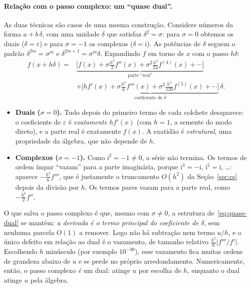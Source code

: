 \documentclass[11pt,a4paper]{article}
\begin{document}
\paragraph{Relação com o passo complexo: um ``quase dual''.} As duas técnicas são casos de uma mesma construção. Considere números da forma $a+b\,\delta$, com uma unidade $\delta$ que satisfaz $\delta^2=\sigma$: para $\sigma=0$ obtemos os duais ($\delta=\varepsilon$) e para $\sigma=-1$ os complexos ($\delta=\mathrm i$). As potências de $\delta$ seguem o padrão $\delta^{2m}=\sigma^m$ e $\delta^{2m+1}=\sigma^m\delta$. Expandindo $f$ em torno de $x$ com o passo $h\delta$:
\begin{equation}
\begin{aligned}
f(x+h\delta) ={}& \underbrace{\Big[f(x) + \sigma\frac{h^2}{2}f''(x) + \sigma^2\frac{h^4}{24}f^{(4)}(x)+\cdots\Big]}_{\text{parte ``real''}}\\
&+ \underbrace{\Big[h f'(x) + \sigma\frac{h^3}{6}f'''(x) + \sigma^2\frac{h^5}{120}f^{(5)}(x)+\cdots\Big]}_{\text{coeficiente de }\delta}\,\delta .
\end{aligned}
\label{eq:quase-dual}
\end{equation}
\begin{itemize}
\item \textbf{Duais ($\sigma=0$).} Tudo depois do primeiro termo de cada colchete desaparece: o coeficiente de $\varepsilon$ é \emph{exatamente} $hf'(x)$ (com $h=1$, a semente do modo direto), e a parte real é exatamente $f(x)$. A exatidão é \emph{estrutural}, uma propriedade da álgebra, que não depende de $h$.
\item \textbf{Complexos ($\sigma=-1$).} Como $\mathrm i^2=-1\ne0$, a série não termina. Os termos de ordem ímpar ``vazam'' para a parte imaginária, porque $\mathrm i^3=-\mathrm i$, $\mathrm i^5=\mathrm i$, \dots: aparece $-\frac{h^3}{6}f'''$, que é justamente o truncamento $O(h^2)$ da Seção~\ref{sec:cs} depois da divisão por $h$. Os termos pares vazam para a parte real, como $-\frac{h^2}{2}f''$.
\end{itemize}
O que salva o passo complexo é que, mesmo com $\sigma\ne0$, a estrutura de~\eqref{eq:quase-dual} se mantém: \emph{a derivada é o termo principal do coeficiente de $\delta$}, sem nenhuma parcela $O(1)$ a remover. Logo não há subtração nem termo $u/h$, e o único defeito em relação ao dual é o vazamento, de tamanho relativo $\frac{h^2}{6}|f'''/f'|$. Escolhendo $h$ minúsculo (por exemplo $10^{-30}$), esse vazamento fica muitas ordens de grandeza abaixo de $u$ e se perde no próprio arredondamento. Numericamente, então, o passo complexo \emph{é} um dual: atinge $u$ por escolha de $h$, enquanto o dual atinge $u$ pela álgebra.
\end{document}
